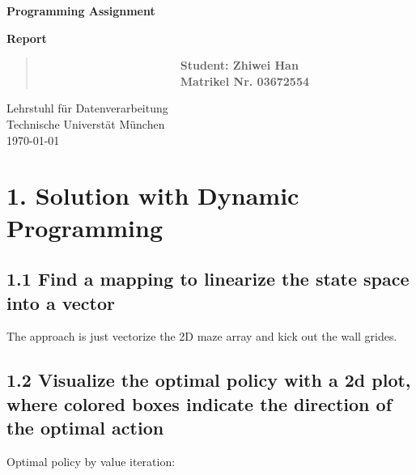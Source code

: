 \documentclass[12pt,a4paper,titlepage]{article}
\begin{document}
\begin{titlepage}
    \begin{center}
        \vspace*{3.5cm}
        
        \textbf{\huge{Programming Assignment}}
        \vspace{1cm}

        \textbf{\huge{Report}}

        \vspace{6cm}

        \begin{verse}
            \ \ \ \ \ \ \ \ \ \ \ \ \ \ \ \ \ \ \ \ \ \ \ \ \ \textbf{\large{Student: Zhiwei Han}}\\
            \ \ \ \ \ \ \ \ \ \ \ \ \ \ \ \ \ \ \ \ \ \ \ \ \ \textbf{\large{Matrikel Nr. 03672554
            }}\\
        \end{verse}


        
        \vspace{1cm}
        
        
        Lehrstuhl f\"ur Datenverarbeitung\\
        Technische Universt\"at M\"unchen\\
        \today
        
    \end{center}
\end{titlepage}



\setlength{\parindent}{0pt} \setlength{\parskip}{2ex plus 0.5ex
minus 0.2ex}


\section*{1. Solution with Dynamic Programming}
\subsection*{1.1 Find a mapping to linearize the state space into a vector}
The approach is just vectorize the 2D maze array and kick out the wall grides.
\subsection*{1.2 Visualize the optimal policy with a 2d plot, where colored boxes indicate the direction of the optimal action}
Optimal policy by value iteration:\\
\end{document}
